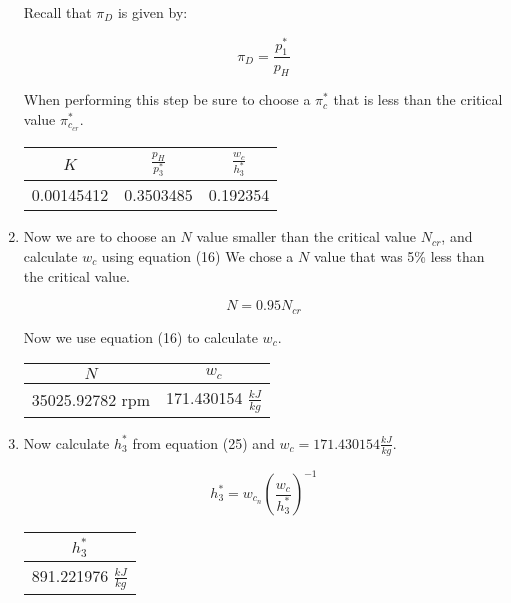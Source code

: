 \documentclass[12pt,english]{article}
\begin{document}
\begin{enumerate}
  Recall that $\pi_{D}$ is given by:

  \begin{equation}
    \pi_{D} = \frac{p_{1}^{*}}{p_{H}}
  \end{equation}

  When performing this step be sure to choose a $\pi_{c}^{*}$ that is less than the critical value $\pi_{c_{cr}}^{*}$.

  \begin{center}
    \begin{tabular}{|c|c|c|}
      \hline
      $K$ & $\frac{p_{H}}{p_{3}^{*}}$ & $\frac{w_{c}}{h_{3}^{*}}$ \\
      \hline
      0.00145412 & 0.3503485 & 0.192354 \\
      \hline
    \end{tabular}
  \end{center}

  \item Now we are to choose an $N$ value smaller than the critical value $N_{cr}$, and calculate $w_{c}$ using equation (16)
  We chose a $N$ value that was 5\% less than the critical value.

  \begin{equation}
    N = 0.95 N_{cr}
  \end{equation}

  Now we use equation (16) to calculate $w_{c}$. 

  \begin{center}
    \begin{tabular}{|c|c|}
      \hline
      $N$ & $w_{c}$ \\
      \hline
      35025.92782 rpm & 171.430154 $\frac{kJ}{kg}$ \\
      \hline
    \end{tabular}
  \end{center}

  \item Now calculate $h_{3}^{*}$ from equation (25) and $w_{c} = 171.430154 \frac{kJ}{kg}$.
  
  \begin{equation}
    h_{3}^{*} = w_{c_{n}} \left( \frac{w_{c}}{h_{3}^{*}}\right)^{-1}
  \end{equation}

  \begin{center}
    \begin{tabular}{|c|}
      \hline
      $h_{3}^{*}$ \\
      \hline
      891.221976 $\frac{kJ}{kg}$ \\
      \hline
    \end{tabular}
  \end{center}


\end{enumerate}
\end{document}
